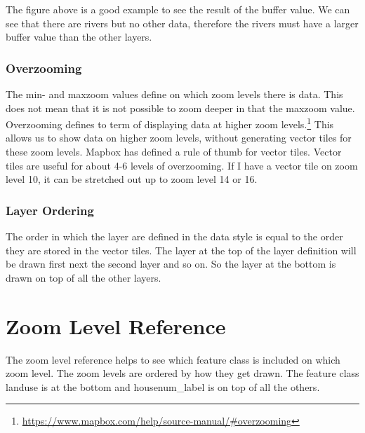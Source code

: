 The figure above is a good example to see the result of the buffer value. We can see that there are rivers but no other data, therefore the rivers must have a larger buffer value than the other layers.

\subsubsection{Overzooming}\label{overzooming}
The min- and maxzoom values define on which zoom levels there is data. This does not mean that it is not possible to zoom deeper in that the maxzoom value.
Overzooming defines to term of displaying data at higher zoom levels.\footnote{\url{https://www.mapbox.com/help/source-manual/\#overzooming}}
This allows us to show data on higher zoom levels, without generating vector tiles for these zoom levels.
Mapbox has defined a rule of thumb for vector tiles. Vector tiles are useful for about 4-6 levels of overzooming. If I have a vector tile on zoom level 10, it can be stretched out up to zoom level 14 or 16.  

\subsubsection{Layer Ordering}\label{layer_ordering}
The order in which the layer are defined in the data style is equal to the order they are stored in the vector tiles.
The layer at the top of the layer definition will be drawn first next the second layer and so on. So the layer at the bottom is drawn on top of all the other layers.


\section{Zoom Level Reference}\label{zoomlevel_reference}
The zoom level reference helps to see which feature class is included on which zoom level. The zoom levels are ordered by how they get drawn. The feature class landuse is at the bottom and housenum\_label is on top of all the others. 

